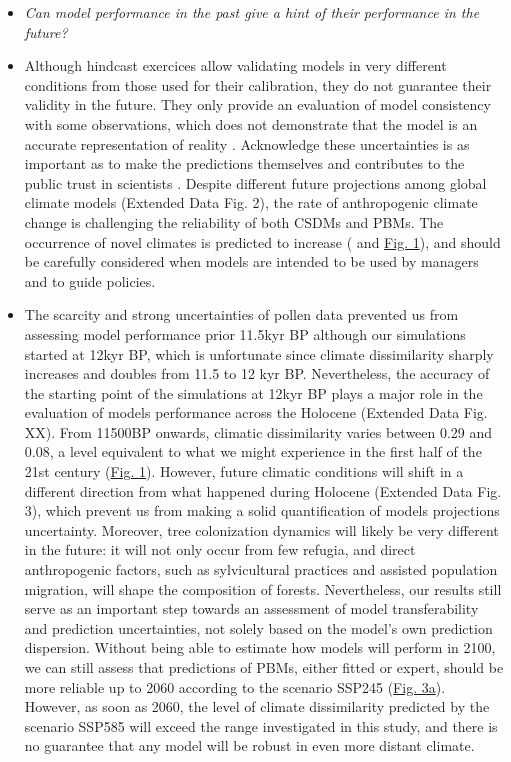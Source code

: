 \documentclass[pdflatex, sn-nature]{sn-jnl}%
\begin{document}
\begin{itemize}
\item \emph{Can model performance in the past give a hint of their performance in the future?}\par
\item Although hindcast exercices allow validating models in very different conditions from those used for their calibration, they do not guarantee their validity in the future. They only provide an evaluation of model consistency with some observations, which does not demonstrate that the model is an accurate representation of reality \cite{Oreskes1994}. Acknowledge these uncertainties is as important as to make the predictions themselves \cite{Beale2012} and contributes to the public trust in scientists \cite{Berkhout2010}. Despite different future projections among global climate models (Extended Data Fig. 2), the rate of anthropogenic climate change is challenging the reliability of both CSDMs and PBMs. The occurrence of novel climates is predicted to increase (\cite{Williams2007} and \hyperref[climatic_dissimilarity]{Fig. 1}), and should be carefully considered when models are intended to be used by managers and to guide policies.
\item The scarcity and strong uncertainties of pollen data prevented us from assessing model performance prior 11.5kyr BP although our simulations started at 12kyr BP, which is unfortunate since climate dissimilarity sharply increases and doubles from 11.5 to 12 kyr BP. Nevertheless, the accuracy of the starting point of the simulations at 12kyr BP plays a major role in the evaluation of models performance across the Holocene (Extended Data Fig. XX).  From 11500BP onwards, climatic dissimilarity varies between 0.29 and 0.08, a level equivalent to what we might experience in the first half of the 21st century (\hyperref[climatic_dissimilarity]{Fig. 1}). However, future climatic conditions will shift in a different direction from what happened during Holocene (Extended Data Fig. 3), which prevent us from making a solid quantification of models projections uncertainty. Moreover, tree colonization dynamics will likely be very different in the future: it will not only occur from few refugia, and direct anthropogenic factors, such as sylvicultural practices and assisted population migration, will shape the composition of forests. Nevertheless, our results still serve as an important step towards an assessment of model transferability and prediction uncertainties, not solely based on the model's own prediction dispersion. Without being able to estimate how models will perform in 2100, we can still assess that predictions of PBMs, either fitted or expert, should be more reliable up to 2060 according to the scenario SSP245 (\hyperref[past_performance]{Fig. 3a}). However, as soon as 2060, the level of climate dissimilarity predicted by the scenario SSP585 will exceed the range investigated in this study, and there is no guarantee that any model will be robust in even more distant climate. 


\end{itemize}
\end{document}

